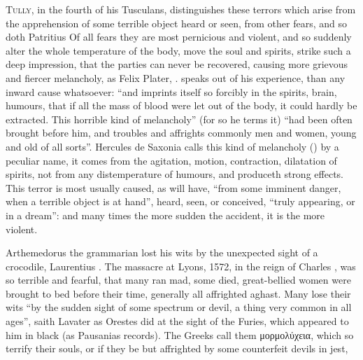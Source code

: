 \lettrine{T}{ully}, in the fourth of his Tusculans, distinguishes these terrors
which arise from the apprehension of some terrible object heard or seen, from
other fears, and so doth Patritius  Of all fears they are most pernicious and violent, and so
suddenly alter the whole temperature of the body, move the soul and spirits,
strike such a deep impression, that the parties can never be recovered, causing
more grievous and fiercer melancholy, as Felix Plater, . speaks out of his experience, than
any inward cause whatsoever: \enquote{and imprints itself so forcibly in the spirits,
brain, humours, that if all the mass of blood were let out of the body, it
could hardly be extracted. This horrible kind of melancholy} (for so he terms
it) \enquote{had been often brought before him, and troubles and affrights commonly men
and women, young and old of all sorts}. Hercules de
Saxonia calls this kind of melancholy () by a
peculiar name, it comes from the agitation, motion, contraction, dilatation of
spirits, not from any distemperature of humours, and produceth strong effects.
This terror is most usually caused, as \Plutarch{} will have,
\enquote{from some imminent danger, when a terrible object is at hand}, heard, seen, or
conceived, \enquote{truly appearing, or in a
dream}: and many times the more sudden the accident, it is
the more violent.


Arthemedorus the grammarian lost his wits by the unexpected sight of a
crocodile, Laurentius .
The massacre at Lyons, 1572, in the reign of Charles ,
was so terrible and fearful, that many ran mad, some died, great-bellied women
were brought to bed before their time, generally all affrighted aghast. Many
lose their wits \enquote{by the sudden sight of some spectrum or
devil, a thing very common in all ages}, saith Lavater
 as Orestes did at the sight of the
Furies, which appeared to him in black (as Pausanias
records). The Greeks call them \textgreek{μορμολύχεια}, which so terrify their
souls, or if they be but affrighted by some counterfeit devils in jest,

